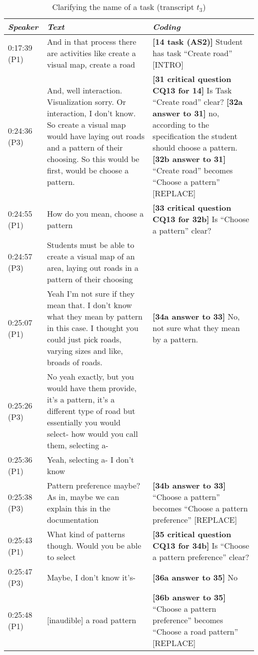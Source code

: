 \begin{table}[!htbp]
\begin{tabular}{|p{17mm}|p{63mm}|p{70mm}|}
\hline
\textit{Speaker} & \textit{Text} & \textit{Coding}\\
\hline
0:17:39 (P1) & And in that process there are activities like create a visual map, create a road& \textbf{[14 task (AS2)]} Student has task ``Create road'' \textsf{[INTRO]}\\
\hline
0:24:36 (P3)	& And, well interaction. Visualization sorry. Or interaction, I don't know. So create a visual map would have laying out roads and a pattern of their choosing. So this would be first, would be choose a pattern. & \textbf{[31 critical question CQ13 for 14]} Is Task ``Create road'' clear?\newline
\textbf{[32a answer to 31]} no, according to the specification the student should choose a pattern. \newline
\textbf{[32b answer to 31]} ``Create road'' becomes ``Choose a pattern'' \textsf{[REPLACE]}\\
\hline
0:24:55 (P1) &	How do you mean, choose a pattern	& \textbf{[33 critical question CQ13 for 32b]} Is ``Choose a pattern'' clear? \\
\cline{1-2}
0:24:57 (P3)	& Students must be able to create a visual map of an area, laying out roads in a pattern of their choosing	&\\
\cline{1-2}
0:25:07 (P1)	& Yeah I'm not sure if they mean that. I don't know what they mean by pattern in this case. I thought you could just pick roads, varying sizes and like, broads of roads. & 
\textbf{[34a answer to 33]} No, not sure what they mean by a pattern.\\
\cline{1-2}
0:25:26 (P3) & No yeah exactly, but you would have them provide, it's a pattern, it's a different type of road but essentially you would select- how would you call them, selecting a- & \\
\cline{1-2}
0:25:36 (P1) & Yeah, selecting a- I don't know &\\
\cline{1-2}
0:25:38 (P3)	& Pattern preference maybe? As in, maybe we can explain this in the documentation & \textbf{[34b answer to 33]} ``Choose a pattern'' becomes ``Choose a pattern preference'' \textsf{[REPLACE]}\\
\hline
0:25:43 (P1) & What kind of patterns though. Would you be able to select & \textbf{[35 critical question CQ13 for 34b]} Is ``Choose a pattern preference'' clear?\\
\cline{1-2}
0:25:47 (P3) & Maybe, I don't know it's- & \textbf{[36a answer to 35]} No \\
\cline{1-2}
0:25:48 (P1)	& [inaudible] a road pattern& \textbf{[36b answer to 35]} ``Choose a pattern preference'' becomes ``Choose a road pattern'' \textsf{[REPLACE]}\\
\hline
\end{tabular}
\caption{Clarifying the name of a task (transcript $t_3$)}
\label{table:transcript:task-clarification}


\end{table}
